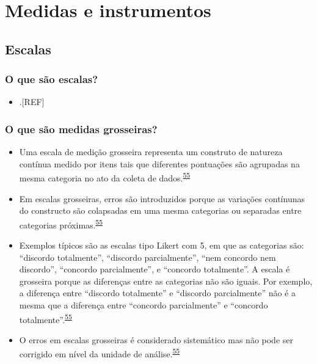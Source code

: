 \documentclass[
  a4paper,
]{book}
\providecommand{\tightlist}{%
  \setlength{\itemsep}{0pt}\setlength{\parskip}{0pt}}
\begin{document}
\hypertarget{medidas-instrumentos}{%
\chapter{\texorpdfstring{\textbf{Medidas e instrumentos}}{Medidas e instrumentos}}\label{medidas-instrumentos}}

\hypertarget{escalas}{%
\section{Escalas}\label{escalas}}

\hypertarget{o-que-suxe3o-escalas}{%
\subsection{O que são escalas?}\label{o-que-suxe3o-escalas}}

\begin{itemize}
\tightlist
\item
  .{[}REF{]}
\end{itemize}

\hypertarget{o-que-suxe3o-medidas-grosseiras}{%
\subsection{O que são medidas grosseiras?}\label{o-que-suxe3o-medidas-grosseiras}}

\begin{itemize}
\item
  Uma escala de medição grosseira representa um construto de natureza contínua medido por itens tais que diferentes pontuações são agrupadas na mesma categoria no ato da coleta de dados.\textsuperscript{\protect\hyperlink{ref-aguinis2008}{55}}
\item
  Em escalas grosseiras, erros são introduzidos porque as variações contínunas do constructo são colapsadas em uma mesma categorias ou separadas entre categorias próximas.\textsuperscript{\protect\hyperlink{ref-aguinis2008}{55}}
\item
  Exemplos típicos são as escalas tipo Likert com 5, em que as categorias são: ``discordo totalmente'', ``discordo parcialmente'', ``nem concordo nem discordo'', ``concordo parcialmente'', e ``concordo totalmente''. A escala é grosseira porque as diferenças entre as categorias não são iguais. Por exemplo, a diferença entre ``discordo totalmente'' e ``discordo parcialmente'' não é a mesma que a diferença entre ``concordo parcialmente'' e ``concordo totalmente''.\textsuperscript{\protect\hyperlink{ref-aguinis2008}{55}}
\item
  O erros em escalas grosseiras é considerado sistemático mas não pode ser corrigido em nível da unidade de análise.\textsuperscript{\protect\hyperlink{ref-aguinis2008}{55}}
\end{itemize}
\end{document}
